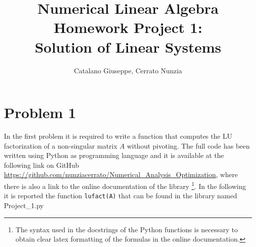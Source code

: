 \documentclass[a4paper,11pt]{article}
\begin{document}
\author{Catalano Giuseppe, Cerrato Nunzia}
\title{Numerical Linear Algebra Homework Project 1:\\Solution of Linear Systems}
\date{}
\maketitle

\section{Problem 1}
In the first problem it is required to write a function that computes the LU factorization of a non-singular matrix $A$ without pivoting. The full code has been written using Python as programming language and it is available at the following link on GitHub \url{https://github.com/nunziacerrato/Numerical_Analysis_Optimization}, where there is also a link to the online documentation of the library \footnote{The syntax used in the docstrings of the Python functions is necessary to obtain clear latex formatting of the formulas in the online documentation.}. In the following it is reported the function \texttt{lufact(A)} that can be found in the library named Project\_1.py
\end{document}
